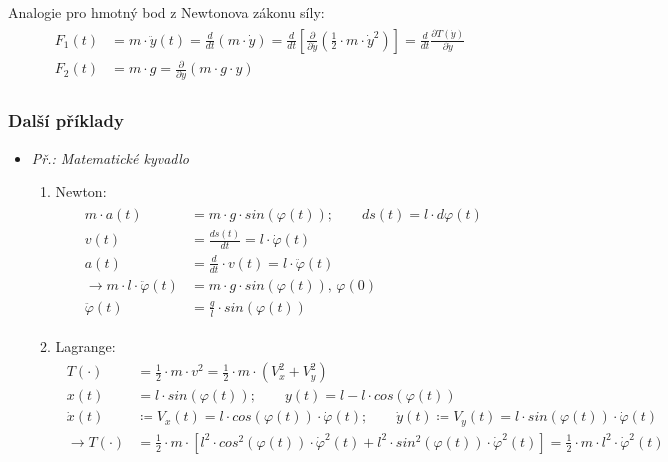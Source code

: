 Analogie pro hmotný bod z Newtonova zákonu síly:
\begin{align}
\begin{split}
F_1(t) &= m \cdot \ddot{y}(t) = \frac{d}{dt}(m \cdot \dot{y}) = \frac{d}{dt} \left[ \frac{\partial}{\partial \dot{y}} (\frac{1}{2} \cdot m \cdot \dot{y}^2 ) \right] =  \frac{d}{dt} \frac{\partial T(\dot{y})}{\partial \dot{y}} \\
F_2(t) &= m \cdot g = \frac{\partial}{\partial y} (m \cdot g \cdot y)
\end{split}
\end{align}

\subsubsection*{Další příklady}
\begin{itemize}
\item \textit{Př.: Matematické kyvadlo}
\begin{enumerate}[label=(\alph*)]
\item Newton:
\begin{align*}
\begin{split}
m \cdot a(t) &= m \cdot g \cdot sin(\varphi(t)); \qquad ds(t) = l \cdot d\varphi(t) \\
v(t) &= \frac{ds(t)}{dt} = l \cdot \dot{\varphi}(t) \\
a(t) &= \frac{d}{dt} \cdot v(t) = l \cdot \ddot{\varphi}(t) \\
\to m \cdot l \cdot \ddot{\varphi}(t) &= m \cdot g \cdot sin(\varphi(t)), \, \varphi(0) \\
\ddot{\varphi}(t) &= \frac{g}{l} \cdot sin(\varphi(t))
\end{split}
\end{align*}
\item Lagrange:
\begin{align*}
\begin{split}
T(\cdot) &= \frac{1}{2} \cdot m \cdot v^2 = \frac{1}{2} \cdot m \cdot (V_x^2 + V_y^2) \\
x(t) &= l \cdot sin(\varphi(t)); \qquad y(t) = l - l \cdot cos(\varphi(t)) \\
\dot{x}(t) &\coloneqq V_x(t) = l \cdot cos(\varphi(t)) \cdot \dot{\varphi}(t); \qquad
\dot{y}(t) \coloneqq V_y(t) = l \cdot sin(\varphi(t)) \cdot \dot{\varphi}(t) \\
\to T(\cdot) &= \frac{1}{2} \cdot m \cdot \left[l^2 \cdot cos^2(\varphi(t)) \cdot \dot{\varphi}^2(t) + l^2 \cdot sin^2(\varphi(t)) \cdot \dot{\varphi}^2(t)\right] = \frac{1}{2} \cdot m \cdot l^2 \cdot \dot{\varphi}^2(t)

\end{split}
\end{align*}
\end{enumerate}
\end{itemize}
